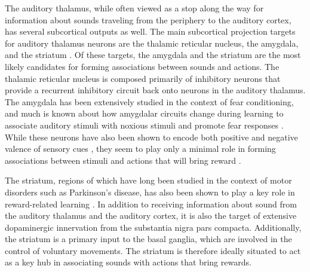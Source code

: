 The auditory thalamus, while often viewed as a stop along the way for information about sounds traveling from the periphery to the auditory cortex, has several subcortical outputs as well.
The main subcortical projection targets for auditory thalamus neurons are the thalamic reticular nucleus, the amygdala, and the striatum \citep{Pinault2004, Bartlett2013}.
Of these targets, the amygdala and the striatum are the most likely candidates for forming associations between sounds and actions.
The thalamic reticular nucleus is composed primarily of inhibitory neurons that provide a recurrent inhibitory circuit back onto neurons in the auditory thalamus. 
The amygdala has been extensively studied in the context of fear conditioning, and much is known about how amygdalar circuits change during learning to associate auditory stimuli with noxious stimuli and promote fear responses \citep{Romanski1992, Rogan1997, Doron1999, Ledoux2000}. 
While these neurons have also been shown to encode both positive and negative valence of sensory cues \citep{Tye2008}, they seem to play only a minimal role in forming associations between stimuli and actions that will bring reward \citep{Baxter2002}.

The striatum, regions of which have long been studied in the context of motor disorders such as Parkinson's disease, has also been shown to play a key role in reward-related learning \citep{Wickens2003, Balleine2007}.
In addition to receiving information about sound from the auditory thalamus and the auditory cortex, it is also the target of extensive dopaminergic innervation from the substantia nigra pars compacta. 
Additionally, the striatum is a primary input to the basal ganglia, which are involved in the control of voluntary movements.
The striatum is therefore ideally situated to act as a key hub in associating sounds with actions that bring rewards.

